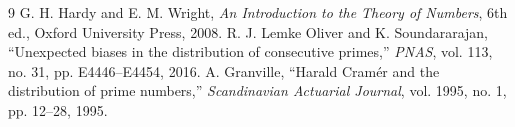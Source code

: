 \documentclass[12pt,a4paper]{article}
\begin{document}
\begin{thebibliography}{9}
 G. H. Hardy and E. M. Wright, \textit{An Introduction to the Theory of Numbers}, 6th ed., Oxford University Press, 2008.
 R. J. Lemke Oliver and K. Soundararajan, ``Unexpected biases in the distribution of consecutive primes,'' \textit{PNAS}, vol. 113, no. 31, pp. E4446--E4454, 2016.
 A. Granville, ``Harald Cram\'er and the distribution of prime numbers,'' \textit{Scandinavian Actuarial Journal}, vol. 1995, no. 1, pp. 12--28, 1995.
\end{thebibliography}
\end{document}
